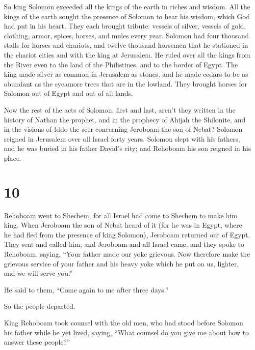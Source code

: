  So king Solomon exceeded all the kings of the earth in
riches and wisdom.  All the kings of the earth sought the
presence of Solomon to hear his wisdom, which God had put in his heart.
 They each brought tribute: vessels of silver, vessels of
gold, clothing, armor, spices, horses, and mules every year.
 Solomon had four thousand stalls for horses and
chariots, and twelve thousand horsemen that he stationed in the chariot
cities and with the king at Jerusalem.  He ruled over all
the kings from the River even to the land of the Philistines, and to the
border of Egypt.  The king made silver as common in
Jerusalem as stones, and he made cedars to be as abundant as the
sycamore trees that are in the lowland.  They brought
horses for Solomon out of Egypt and out of all lands.

 Now the rest of the acts of Solomon, first and last,
aren't they written in the history of Nathan the prophet, and in the
prophecy of Ahijah the Shilonite, and in the visions of Iddo the seer
concerning Jeroboam the son of Nebat?  Solomon reigned in
Jerusalem over all Israel forty years.  Solomon slept
with his fathers, and he was buried in his father David's city; and
Rehoboam his son reigned in his place.

\hypertarget{section-9}{%
\section{10}\label{section-9}}

 Rehoboam went to Shechem, for all Israel had come to
Shechem to make him king.  When Jeroboam the son of Nebat
heard of it (for he was in Egypt, where he had fled from the presence of
king Solomon), Jeroboam returned out of Egypt.  They sent
and called him; and Jeroboam and all Israel came, and they spoke to
Rehoboam, saying,  ``Your father made our yoke grievous.
Now therefore make the grievous service of your father and his heavy
yoke which he put on us, lighter, and we will serve you.''

 He said to them, ``Come again to me after three days.''

So the people departed.

 King Rehoboam took counsel with the old men, who had
stood before Solomon his father while he yet lived, saying, ``What
counsel do you give me about how to answer these people?''

